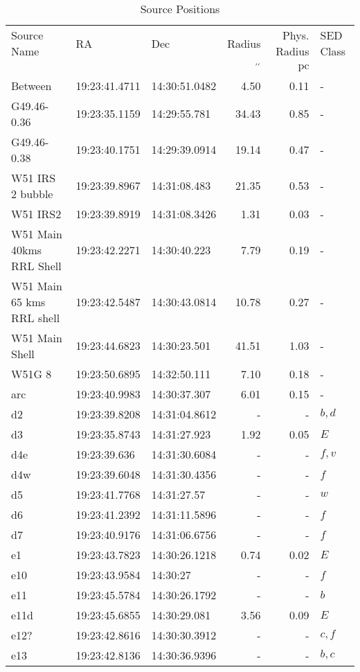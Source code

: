 \begin{table*}[htp]
\caption{Source Positions}
\begin{tabular}{lllrr}
\label{tab:positions}
Source Name & RA & Dec & Radius & Phys. Radius & SED Class \\
 &  &  & $\mathrm{{}^{\prime\prime}}$ & $\mathrm{pc}$ &  \\
\hline
Between & 19:23:41.4711 & 14:30:51.0482 & 4.50 & 0.11 & - \\
G49.46-0.36 & 19:23:35.1159 & 14:29:55.781 & 34.43 & 0.85 & - \\
G49.46-0.38 & 19:23:40.1751 & 14:29:39.0914 & 19.14 & 0.47 & - \\
W51 IRS 2 bubble & 19:23:39.8967 & 14:31:08.483 & 21.35 & 0.53 & - \\
W51 IRS2 & 19:23:39.8919 & 14:31:08.3426 & 1.31 & 0.03 & - \\
W51 Main 40kms RRL Shell & 19:23:42.2271 & 14:30:40.223 & 7.79 & 0.19 & - \\
W51 Main 65 kms RRL shell & 19:23:42.5487 & 14:30:43.0814 & 10.78 & 0.27 & - \\
W51 Main Shell & 19:23:44.6823 & 14:30:23.501 & 41.51 & 1.03 & - \\
W51G 8 & 19:23:50.6895 & 14:32:50.111 & 7.10 & 0.18 & - \\
arc & 19:23:40.9983 & 14:30:37.307 & 6.01 & 0.15 & - \\
d2 & 19:23:39.8208 & 14:31:04.8612 & - & - & $b,d$ \\
d3 & 19:23:35.8743 & 14:31:27.923 & 1.92 & 0.05 & $E$ \\
d4e & 19:23:39.636 & 14:31:30.6084 & - & - & $f,v$ \\
d4w & 19:23:39.6048 & 14:31:30.4356 & - & - & $f$ \\
d5 & 19:23:41.7768 & 14:31:27.57 & - & - & $w$ \\
d6 & 19:23:41.2392 & 14:31:11.5896 & - & - & $f$ \\
d7 & 19:23:40.9176 & 14:31:06.6756 & - & - & $f$ \\
e1 & 19:23:43.7823 & 14:30:26.1218 & 0.74 & 0.02 & $E$ \\
e10 & 19:23:43.9584 & 14:30:27 & - & - & $f$ \\
e11 & 19:23:45.5784 & 14:30:26.1792 & - & - & $b$ \\
e11d & 19:23:45.6855 & 14:30:29.081 & 3.56 & 0.09 & $E$ \\
e12? & 19:23:42.8616 & 14:30:30.3912 & - & - & $c,f$ \\
e13 & 19:23:42.8136 & 14:30:36.9396 & - & - & $b,c$ \\

\end{tabular}
\end{table*}
